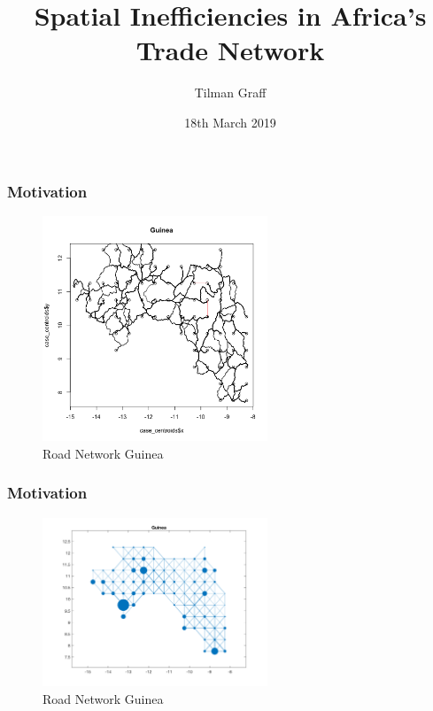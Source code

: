 \documentclass[]{beamer}   	%
\title{Spatial Inefficiencies in Africa's Trade Network}
\author{Tilman Graff}
\institute{Busara Center for Behavioral Economics \\ \& Princeton University}
\date{18th March 2019}
\begin{document}
\begin{frame}
  \titlepage
\end{frame}

\begin{frame}
  \frametitle{Motivation}
  \begin{figure}
    \includegraphics[width=0.6\textwidth, trim={1cm 1cm 0cm 2cm},clip]{../../Build/output/Road_Networks/network_Guinea.png}
    \caption{Road Network Guinea}

  \end{figure}
\end{frame}

\begin{frame}
  \frametitle{Motivation}
\begin{figure}
    \includegraphics[width=0.6\textwidth, trim={2cm 1cm 1.5cm 0cm},clip]{../../Build/output/Matlab_graphs/Nicer_graphs/Guinea_stat.png}
    \caption{Road Network Guinea}

  \end{figure}
\end{frame}
\end{document}
